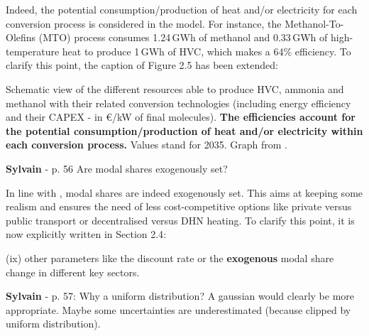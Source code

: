 \documentclass[12pt,a4paper]{article}
\begin{document}
\noindent Indeed, the potential consumption/production of heat and/or electricity for each conversion process is considered in the model. For instance, the Methanol-To-Olefins (MTO) process consumes 1.24\,GWh of methanol and 0.33\,GWh of high-temperature heat to produce 1\,GWh of HVC, which makes a 64\% efficiency. To clarify this point, {\color{blue}the caption of Figure 2.5} has been extended:

\begin{mdframed}[style=manuscript] %
Schematic view of the different resources able to produce HVC, ammonia and methanol with their related conversion technologies (including energy efficiency and their CAPEX - in €/kW of final molecules).  \textbf{The efficiencies account for the potential consumption/production of heat and/or electricity within each conversion process.} Values stand for 2035. Graph from \cite{rixhon2021comprehensive}.
\end{mdframed}

\begin{mdframed}[style=comment] %
{\color{purple} \textbf{Sylvain}} - p. 56 Are modal shares exogenously set?
\end{mdframed}

\noindent In line with \citet{limpens2019energyscope}, modal shares are indeed exogenously set. This aims at keeping some realism and ensures the need of less cost-competitive options like private versus public transport or decentralised versus DHN heating. To clarify this point, it is now explicitly written {\color{blue}in Section 2.4}:

\begin{mdframed}[style=manuscript] %
[...] (ix) other parameters like the discount rate or the \textbf{exogenous} modal share change in different key sectors.
\end{mdframed}

\begin{mdframed}[style=comment] %
{\color{purple} \textbf{Sylvain}} - p. 57: Why a uniform distribution? A gaussian would clearly be more appropriate. Maybe some uncertainties are underestimated (because clipped by uniform distribution).
\end{mdframed}
\end{document}
